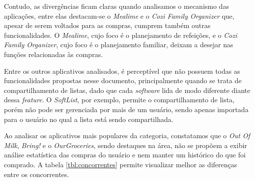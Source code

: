 Contudo, as divergências ficam claras quando analisamos o mecanismo das aplicações, entre elas destacam-se o \textit{Mealime} e o \textit{Cozi Family Organizer} que, apesar de serem voltados para as compras, cumprem também outras funcionalidades. O \textit{Mealime}, cujo foco é o planejamento de refeições, e o \textit{Cozi Family Organizer}, cujo foco é o planejamento familiar, deixam a desejar nas funções relacionadas às compras.

Entre os outros aplicativos analisados, é perceptível que não possuem todas as funcionalidades propostas nesse documento, principalmente quando se trata de compartilhamento de listas, dado	 que cada \textit{software} lida de modo diferente diante dessa \textit{feature}. O \textit{SoftList}, por exemplo, permite o compartilhamento de lista, porém não pode  ser gerenciada por mais de um usuário, sendo apenas importada para o usuário no qual a lista está sendo compartilhada.

Ao analisar os aplicativos mais populares da categoria, constatamos que o \textit{Out Of Milk}, \textit{Bring!} e o \textit{OurGroceries}, sendo destaques na área, não se propõem a exibir análise estatística das compras do usuário e nem manter um histórico do que foi comprado. A tabela \ref{tbl:concorrentes} permite visualizar melhor as diferenças entre os concorrentes.

\label{tbl:concorrentes}
\begin{table}[h]
\centering
  \caption{Tabela \ref{tbl:concorrentes}: Uma comparação dos aplicativos concorrentes.}
\end{table}
